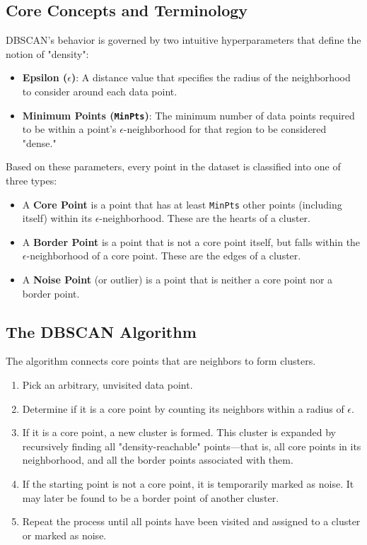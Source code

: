 \subsection*{Core Concepts and Terminology}
DBSCAN's behavior is governed by two intuitive hyperparameters that define the notion of "density":
\begin{itemize}
    \item \textbf{Epsilon ($\epsilon$)}: A distance value that specifies the radius of the neighborhood to consider around each data point.
    \item \textbf{Minimum Points (\texttt{MinPts})}: The minimum number of data points required to be within a point's $\epsilon$-neighborhood for that region to be considered "dense."
\end{itemize}
Based on these parameters, every point in the dataset is classified into one of three types:
\begin{itemize}
    \item A \textbf{Core Point} is a point that has at least \texttt{MinPts} other points (including itself) within its $\epsilon$-neighborhood. These are the hearts of a cluster.
    \item A \textbf{Border Point} is a point that is not a core point itself, but falls within the $\epsilon$-neighborhood of a core point. These are the edges of a cluster.
    \item A \textbf{Noise Point} (or outlier) is a point that is neither a core point nor a border point.
\end{itemize}

\subsection*{The DBSCAN Algorithm}
The algorithm connects core points that are neighbors to form clusters.
\begin{enumerate}
    \item Pick an arbitrary, unvisited data point.
    \item Determine if it is a core point by counting its neighbors within a radius of $\epsilon$.
    \item If it is a core point, a new cluster is formed. This cluster is expanded by recursively finding all "density-reachable" points—that is, all core points in its neighborhood, and all the border points associated with them.
    \item If the starting point is not a core point, it is temporarily marked as noise. It may later be found to be a border point of another cluster.
    \item Repeat the process until all points have been visited and assigned to a cluster or marked as noise.
\end{enumerate}

